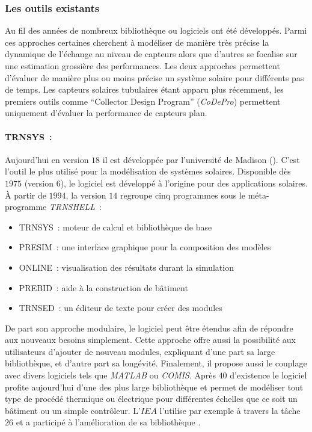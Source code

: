 \subsubsection{Les outils existants} %
\label{ssub:les_outils_existants}
Au fil des années de nombreux bibliothèque ou logiciels ont été développés. Parmi ces
approches certaines cherchent à modéliser de manière très précise la dynamique de
l’échange au niveau de capteurs alors que d’autres se focalise sur une estimation
grossière des performances. Les deux approches permettent d’évaluer de manière plus ou
moins précise un système solaire pour différents pas de temps. Les capteurs solaires
tubulaires étant apparu plus récemment, les premiers outils comme \enquote{Collector
Design Program} (\textit{CoDePro}) permettent uniquement d’évaluer la performance de capteurs
plan.

\paragraph{TRNSYS~:} %
\label{par:trnssys}
Aujourd’hui en version $18$ \parencite{Klein2017} il est développée par l’université de Madison ().
C’est l’outil le plus utilisé pour la modélisation de systèmes solaires.
Disponible dès $1975$ (version $6$), le logiciel est développé à l’origine pour des applications
solaires. À partir de $1994$, la version $14$ regroupe cinq programmes sous le méta-programme \textit{TRNSHELL}~:
\begin{itemize}
    \item TRNSYS~: moteur de calcul et bibliothèque de base
    \item PRESIM~: une interface graphique pour la composition des modèles
    \item ONLINE~: visualisation des résultats durant la simulation
    \item PREBID~: aide à la construction de bâtiment
    \item TRNSED~: un éditeur de texte pour créer des modules
\end{itemize}
De part son approche modulaire, le logiciel peut être étendus afin de répondre aux
nouveaux besoins simplement. Cette approche offre aussi la possibilité aux utilisateurs
d’ajouter de nouveau modules, expliquant d’une part sa large bibliothèque, et d’autre part
sa longévité. Finalement, il propose aussi le couplage avec divers logiciels tels que
\textit{MATLAB} ou \textit{COMIS}. Après $40$ d’existence le logiciel profite aujourd’hui
d’une des plus large bibliothèque et permet de modéliser tout type de procédé thermique ou
électrique pour différentes échelles que ce soit un bâtiment ou un simple contrôleur.
L’$IEA$ l’utilise par exemple à travers la tâche $26$ et a participé à l’amélioration de
sa bibliothèque \parencite{Task26B2002}.

